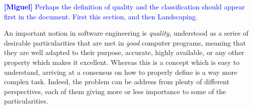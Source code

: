 






\newcommand{\miguel}[1]{\textcolor{blue}{\textbf{[Miguel]} {#1}}} %

\miguel{Perhaps the definition of quality and the classification should appear first in the document. First this section, and then Landscaping.}

An important notion in software engineering is \textit{quality}, understood as a series of desirable particularities that are met in \textit{good} computer programs, meaning that they are well adapted to their purpose, accurate, highly available, or any other property which makes it excellent.
Whereas this is a concept which is easy to understand, arriving at a consensus on how to properly define is a way more complex task. Indeed, the problem can be address from plenty of different perspectives, each of them giving more or less importance to some of the particularities.

